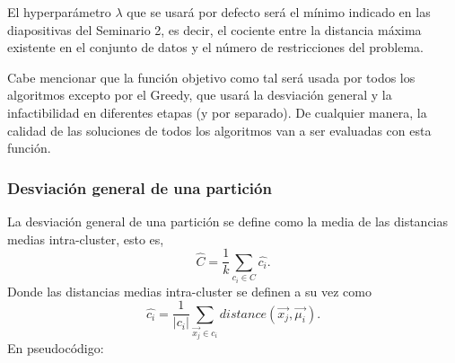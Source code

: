 \documentclass[11pt,a4paper]{article}
\begin{document}
	El hyperparámetro $\lambda$ que se usará por defecto será el mínimo indicado en las diapositivas del Seminario 2, es decir, el cociente entre la distancia máxima existente en el conjunto de datos y el número de restricciones del problema. 
	
	Cabe mencionar que la función objetivo como tal será usada por todos los algoritmos excepto por el Greedy, que usará la desviación general y la infactibilidad en diferentes etapas (y por separado). De cualquier manera, la calidad de las soluciones de todos los algoritmos van a ser evaluadas con esta función.
	\subsubsection{Desviación general de una partición}
	La desviación general de una partición se define como la media de las distancias medias intra-cluster, esto es,
	$$\hat{C} = \frac{1}{k} \sum_{c_i \in C} \hat{c_i}.$$ Donde las distancias medias intra-cluster se definen a su vez como $$\hat{c_i} = \frac{1}{|c_i|} \sum_{\vec{x_j} \in c_i}distance(\vec{x_j}, \vec{\mu_i}).$$ En pseudocódigo:
	
\end{document}
